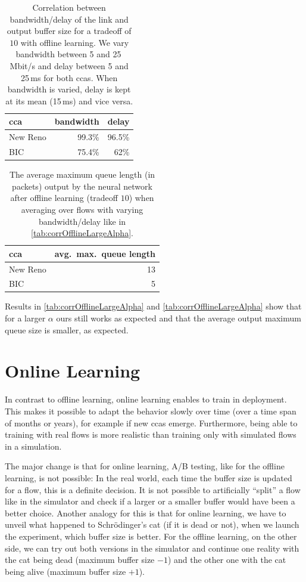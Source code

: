 \documentclass[conference]{IEEEtran}
\begin{document}
\begin{table}[h]
\caption{Correlation between bandwidth/delay of the link and output buffer size for a tradeoff of $10$ with offline learning. We vary bandwidth between 5 and 25\,Mbit/s and delay between 5 and 25\,ms for both \glspl{cca}. When bandwidth is varied, delay is kept at its mean (15\,ms) and vice versa.} \label{tab:corrOfflineLargeAlpha}
\centering
\begin{tabular}{lrr} \toprule
\gls{cca} & bandwidth & delay \\ \midrule
New Reno & 99.3\% & 96.5\% \\
BIC & 75.4\% & 62\% \\
\bottomrule
\end{tabular}
\end{table}

\begin{table}[h]
\caption{The average maximum queue length (in packets) output by the neural network after offline learning (tradeoff $10$) when averaging over flows with varying bandwidth/delay like in \autoref{tab:corrOfflineLargeAlpha}.} \label{tab:avgOfflineLargeAlpha}
\centering
\begin{tabular}{lr} \toprule
\gls{cca} & avg.~max.~queue length \\ \midrule
New Reno & 13 \\
BIC & 5 \\
\bottomrule
\end{tabular}
\end{table}

Results in \autoref{tab:corrOfflineLargeAlpha} and \autoref{tab:corrOfflineLargeAlpha} show that for a larger $\alpha$ \gls{ours} still works as expected and that the average output maximum queue size is smaller, as expected. 

\section{Online Learning}

In contrast to offline learning, online learning enables to train in deployment. This makes it possible to adapt the behavior slowly over time (over a time span of months or years), for example if new \glspl{cca} emerge. Furthermore, being able to training with real flows is more realistic than training only with simulated flows in a simulation. 

The major change is that for online learning, A/B testing, like for the offline learning, is not possible: In the real world, each time the buffer size is updated for a flow, this is a definite decision. It is not possible to artificially ``split'' a flow like in the simulator and check if a larger or a smaller buffer would have been a better choice. Another analogy for this is that for online learning, we have to unveil what happened to Schrödinger's cat (if it is dead or not), when we launch the experiment, which buffer size is better. For the offline learning, on the other side, we can try out both versions in the simulator and continue one reality with the cat being dead (maximum buffer size $-1$) and the other one with the cat being alive (maximum buffer size $+1$). 
\end{document}
